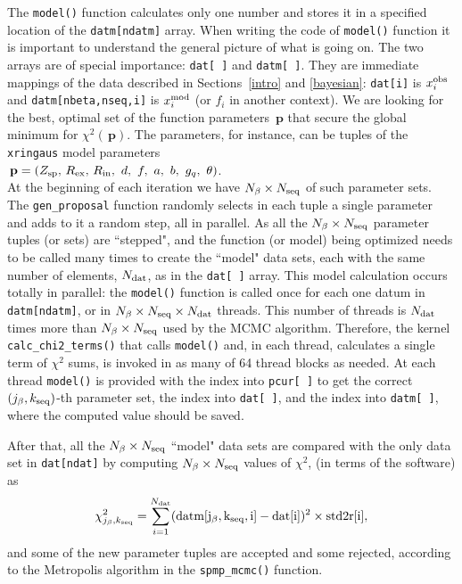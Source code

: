 \documentclass[preprint2]{aastex}
\newcommand{\bfp}{\,\mathbf{p}}
\newcommand{\rex}{\, R_\mathrm{ex}}
\newcommand{\rin}{\, R_\mathrm{in}}
\begin{document}
The \verb|model()| function calculates only one 
number and stores it in a specified location of the \verb|datm[ndatm]| array. 
When writing the code of \verb|model()| function it is important to understand
the general picture of what is going on. The two arrays are of special importance: 
\verb|dat[ ]| and \verb|datm[ ]|. They are immediate mappings of the data 
described in Sections~\ref{intro} and \ref{bayesian}: \verb|dat[i]| is $x_i^{\rm obs}$ and 
\verb|datm[nbeta,nseq,i]| is $x_i^{\rm mod}$ (or $f_i$ in another context).
We are looking for the best, optimal set of the function parameters $\bfp$ that secure 
the global minimum for $\chi^2(\bfp)$.
The parameters, for instance, can be tuples of the \verb|xringaus| model parameters \\
$\bfp = (Z_{\rm sp}, \rex, \rin, \ d, \ f, \ a, \ b, \ g_q, \ \theta)$. \\  
At the beginning of each iteration we have $N_\beta \times N_{\rm seq}$ of such 
parameter sets. The \verb|gen_proposal| function randomly selects in each tuple
a single parameter and adds to it a random step, all in parallel. As all 
the $N_\beta \times N_{\rm seq}$ parameter tuples (or sets) are ``stepped", and 
the function (or model) being optimized needs to be called many times to create the
``model" data sets, each with the same number of elements, $N_{\rm dat}$, as 
in the \verb|dat[ ]| array. This model calculation occurs totally in parallel:
the \verb|model()| function is called once for each one datum in \verb|datm[ndatm]|,
or in $N_\beta \times N_{\rm seq} \times N_{\rm dat}$ threads. This number of
threads is $N_{\rm dat}$ times more than $N_\beta \times N_{\rm seq} $ used by 
the MCMC algorithm. Therefore, the kernel \verb|calc_chi2_terms()| that calls 
\verb|model()| and, in each thread, calculates a single term of $\chi^2$ sums,
is invoked in as many of 64 thread blocks as needed. At each thread
\verb|model()| is provided with the index into \verb|pcur[ ]| to get the correct
$(j_\beta,k_{\rm seq})$-th 
parameter set, the index into \verb|dat[ ]|, and the index into \verb|datm[ ]|, 
where the computed value should be saved.

After that, all the $N_\beta \times N_{\rm seq}$ ``model" data sets are
compared with the only data set in \verb|dat[ndat]| by computing 
$N_\beta \times N_{\rm seq}$ values of $\chi^2$, (in terms of the software) as 
\begin{equation} \label{chi2_soft}
  \chi^2_{j_\beta,k_{\rm seq}} = \sum_{i=1}^{N_{\rm dat}} 
     ({\rm datm[j_\beta,k_{\rm seq},i]} - {\rm dat[i]})^2 \times {\rm std2r[i]},
\end{equation}
and some of the new parameter tuples are accepted and some rejected, according 
to the Metropolis algorithm in the \verb|spmp_mcmc()| function. 
\end{document}
